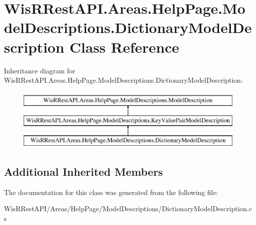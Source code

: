 \hypertarget{class_wis_r_rest_a_p_i_1_1_areas_1_1_help_page_1_1_model_descriptions_1_1_dictionary_model_description}{}\section{Wis\+R\+Rest\+A\+P\+I.\+Areas.\+Help\+Page.\+Model\+Descriptions.\+Dictionary\+Model\+Description Class Reference}
\label{class_wis_r_rest_a_p_i_1_1_areas_1_1_help_page_1_1_model_descriptions_1_1_dictionary_model_description}
Inheritance diagram for Wis\+R\+Rest\+A\+P\+I.\+Areas.\+Help\+Page.\+Model\+Descriptions.\+Dictionary\+Model\+Description\+:\begin{figure}[H]
\begin{center}
\leavevmode
\includegraphics[height=3.000000cm]{class_wis_r_rest_a_p_i_1_1_areas_1_1_help_page_1_1_model_descriptions_1_1_dictionary_model_description}
\end{center}
\end{figure}
\subsection*{Additional Inherited Members}


The documentation for this class was generated from the following file\+:\begin{DoxyCompactItemize}
\item 
Wis\+R\+Rest\+A\+P\+I/\+Areas/\+Help\+Page/\+Model\+Descriptions/Dictionary\+Model\+Description.\+cs\end{DoxyCompactItemize}
